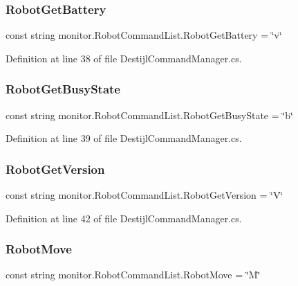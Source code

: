 \subsubsection{Robot\+Get\+Battery}
{\footnotesize\ttfamily const string monitor.\+Robot\+Command\+List.\+Robot\+Get\+Battery = \char`\"{}v\char`\"{}}



Definition at line 38 of file Destijl\+Command\+Manager.\+cs.

\mbox{\label{classmonitor_1_1_robot_command_list_a52a901f4e013dc33ff491c5fcda76860}} 
\subsubsection{Robot\+Get\+Busy\+State}
{\footnotesize\ttfamily const string monitor.\+Robot\+Command\+List.\+Robot\+Get\+Busy\+State = \char`\"{}b\char`\"{}}



Definition at line 39 of file Destijl\+Command\+Manager.\+cs.

\mbox{\label{classmonitor_1_1_robot_command_list_a9a845beb5c040e4813f03cee7cd1cb71}} 
\subsubsection{Robot\+Get\+Version}
{\footnotesize\ttfamily const string monitor.\+Robot\+Command\+List.\+Robot\+Get\+Version = \char`\"{}V\char`\"{}}



Definition at line 42 of file Destijl\+Command\+Manager.\+cs.

\mbox{\label{classmonitor_1_1_robot_command_list_af7017bac04f1976fe1c37e8ec77bcbce}} 
\subsubsection{Robot\+Move}
{\footnotesize\ttfamily const string monitor.\+Robot\+Command\+List.\+Robot\+Move = \char`\"{}M\char`\"{}}



